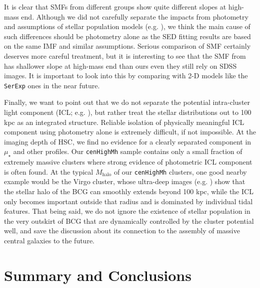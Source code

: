 \documentclass[a4paper,fleqn,usenatbib]{mnras}
\def\rbcg{\texttt{cenHighMh}}
\def\mhalo{{$M_{\mathrm{halo}}$}}
\def\mden{{$\mu_{\star}$}}
\begin{document}
    It is clear that SMFs from different groups show quite different slopes 
    at high-mass end. 
    Although we did not carefully separate the impacts from photometry and 
    assumptions of stellar population models (e.g. \citealt{Bernardi2016}), 
    we think the main cause of such differences should be photometry alone as 
    the SED fitting results are based on the same IMF and similar assumptions.  
    Serious comparison of SMF certainly deserves more careful treatment, 
    but it is interesting to see that the SMF from \citep{Bernardi2013} has 
    shallower slope at high-mass end than ours even they still rely on SDSS
    images. 
    It is important to look into this by comparing with 2-D models like the 
    \texttt{SerExp} ones in the near future.     
      
    Finally, we want to point out that we do not separate the potential intra-cluster 
    light component (ICL; e.g. \citealt{Carlberg1997, Lin2004, Gonzalez2005, 
    Mihos2005}), but rather treat the stellar distributions 
    out to 100 kpc as an integrated structure.
    Reliable isolation of physically meaningful ICL component using photometry 
    alone is extremely difficult, if not impossible. 
    At the imaging depth of HSC, we find no evidence for a clearly separated 
    component in \mden{} and other profiles. 
    Our \rbcg{} sample contains only a small fraction of extremely massive clusters 
    where strong evidence of photometric ICL component is often found. 
    At the typical \mhalo{} of our \rbcg{} clusters, one good nearby example would be 
    the Virgo cluster, whose ultra-deep images (e.g. \citealt{Mihos2016}) show
    that the stellar halo of the BCG can smoothly extends beyond 100 kpc, while the 
    ICL only becomes important outside that radius and is dominated by individual 
    tidal features. 
    That being said, we do not ignore the existence of stellar population in the 
    very outskirt of BCG that are dynamically controlled by the cluster potential 
    well, and save the discussion about its connection to the assembly of massive 
    central galaxies to the future.  

\section{Summary and Conclusions}
    \label{sec:summary}
\end{document}
